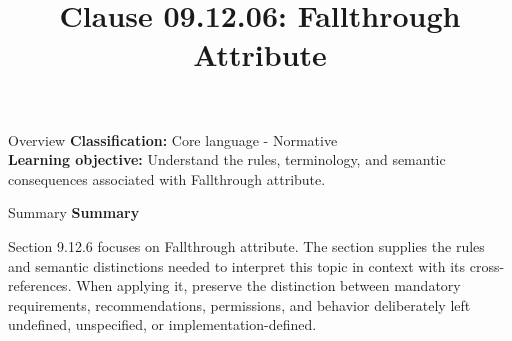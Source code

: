 \documentclass[10pt,letterpaper]{article}
\title{Clause 09.12.06: Fallthrough Attribute}
\author{}
\date{}
\begin{document}
\maketitle
\begin{CornellOverviewBox}{Overview}
\textbf{Classification:} Core language - Normative\\[2pt]
\textbf{Learning objective:} Understand the rules, terminology, and semantic consequences associated with Fallthrough attribute.
\end{CornellOverviewBox}\begin{CornellSummaryBox}{Summary}
{\sffamily\bfseries\color{Accent} Summary}\par\vspace{3pt}Section 9.12.6 focuses on Fallthrough attribute. The section supplies the rules and semantic distinctions needed to interpret this topic in context with its cross-references. When applying it, preserve the distinction between mandatory requirements, recommendations, permissions, and behavior deliberately left undefined, unspecified, or implementation-defined.
\end{CornellSummaryBox}
\end{document}
